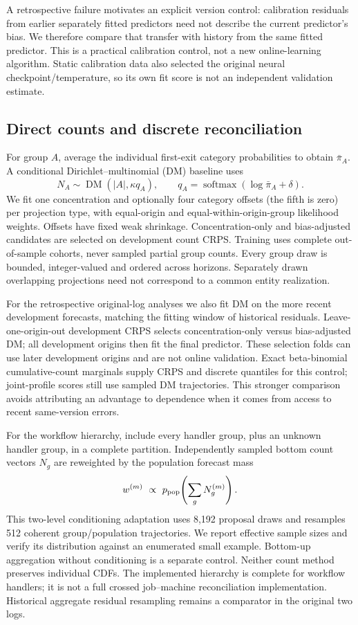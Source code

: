 A retrospective failure motivates an explicit version control: calibration
residuals from earlier separately fitted predictors need not describe the
current predictor's bias. We therefore compare that transfer with history
from the same fitted predictor. This is a practical calibration control,
not a new online-learning algorithm. Static calibration data also selected
the original neural checkpoint/temperature, so its own fit score is not an
independent validation estimate.

\subsection{Direct counts and discrete reconciliation}
For group $A$, average the individual first-exit category probabilities to
obtain $\bar{\pi}_A$. A conditional Dirichlet--multinomial (DM) baseline uses
\begin{equation}
 N_A\sim\operatorname{DM}(|A|,\kappa q_A),\qquad
 q_A=\operatorname{softmax}(\log\bar\pi_A+\delta).
\end{equation}
We fit one concentration and optionally four category offsets (the fifth is
zero) per projection type, with equal-origin and equal-within-origin-group
likelihood weights. Offsets have fixed weak shrinkage. Concentration-only
and bias-adjusted candidates are selected on development count CRPS.
Training uses complete out-of-sample cohorts, never sampled partial group
counts. Every group draw is bounded, integer-valued and ordered across
horizons. Separately drawn overlapping projections need not correspond to a
common entity realization.

For the retrospective original-log analyses we also fit DM on the more recent
development forecasts, matching the fitting window of historical residuals.
Leave-one-origin-out development CRPS selects concentration-only versus
bias-adjusted DM; all development origins then fit the final predictor.
These selection folds can use later development origins and are not online
validation. Exact beta-binomial cumulative-count marginals supply CRPS and
discrete quantiles for this control; joint-profile scores still use sampled
DM trajectories. This stronger comparison avoids attributing an advantage
to dependence when it comes from access to recent same-version errors.

For the workflow hierarchy, include every handler group, plus an unknown
handler group, in a complete partition. Independently sampled bottom count
vectors $N_g$ are reweighted by the population forecast mass
\begin{equation}
 w^{(m)}\ \propto\ p_{\rm pop}\!\left(\sum_gN_g^{(m)}\right).
\end{equation}
This two-level conditioning adaptation \citep{zambon2024} uses 8,192 proposal
draws and resamples 512 coherent group/population trajectories. We report
effective sample sizes and verify its distribution against an enumerated
small example. Bottom-up aggregation without conditioning is a separate
control. Neither count method preserves individual CDFs. The implemented
hierarchy is complete for workflow handlers; it is not a full crossed
job--machine reconciliation implementation. Historical aggregate residual
resampling remains a comparator in the original two logs.

